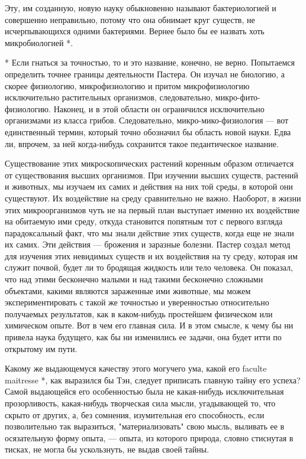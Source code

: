 Эту, им  созданную, новую  науку обыкновенно  называют бактериологией  и
совершенно  неправильно,  потому  что  она  обнимает  круг  существ,  не
исчерпывающихся одними  бактериями.  Вернее  было  бы  ее  назвать  хоть
микробиологией *.

* Если гнаться за точностью, то и это название, конечно, не верно.
Попытаемся определить точнее границы деятельности Пастера. Он изучал
не биологию, а скорее физиологию, микрофизиологию и притом
микрофизиологию исключительно растительных организмов, следовательно,
микро-фито-физиологию. Наконец, и в этой области он ограничился
исключительно организмами из класса грибов. Следовательно,
микро-мико-физиология --- вот единственный термин, который точно
обозначил бы область новой науки. Едва ли, впрочем, за ней
когда-нибудь сохранится такое педантическое название.

Существование этих микроскопических растений коренным образом отличается
от  существования  высших  организмов.  При  изучении  высших   существ,
растений и животных, мы изучаем их самих и действия на них той среды,  в
которой они существуют. Их воздействие  на среду сравнительно не  важно.
Наоборот, в жизни этих микроорганизмов чуть не на первый план  выступает
именно их воздействие на обитаемую ими среду, откуда становится попятным
тот с первого взгляда  парадоксальный факт, что  мы знали действие  этих
существ, когда еще не знали их самих. Эти действия --- брожения и заразные
болезни. Пастер создал метод  для изучения этих  невидимых существ и  их
воздействия на ту среду, которая им служит почвой, будет ли то  бродящая
жидкость или тело человека. Он показал, что над этими бесконечно  малыми
и над такими бесконечно  сложными объектами, какими являются  зараженные
ими животные,  мы  можем  экспериментировать  с  такой  же  точностью  и
уверенностью относительно  получаемых  результатов, как  в  каком-нибудь
простейшем физическом или химическом опыте. Вот в чем его главная  сила.
И в  этом  смысле, к  чему  бы ни  привела  наука будущего,  как  бы  ни
изменились ее задачи, она будет итти по открытому им пути.

Какому же выдающемуся  качеству этого  могучего ума,  какой его  faculte
maitresse *, как выразился бы  Тэн, следует приписать главную тайну  его
успеха?  Самой  выдающейся   его  особенностью   была  не   какая-нибудь
исключительная  прозорливость,  какая-нибудь   творческая  сила   мысли,
угадывающей то, что скрыто от других, а, без сомнения, изумительная  его
способность, если позволительно  так выразиться, "материализовать"  свою
мысль, выливать  ее в  осязательную форму  опыта, ---  опыта, из  которого
природа, словно стиснутая в  тисках, не могла  бы ускользнуть, не  выдав
своей тайны.

